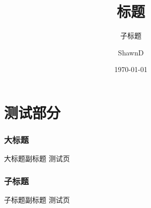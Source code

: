 \documentclass[10pt,mathserif]{beamer}%
\title{标题}
\subtitle{子标题}
\institute[西安电子科技大学\\人工智能学院]{西安电子科技大学人工智能学院} %
\author{ShawnD}
\date{\today}%
\begin{document}
%
{\xdbg {}}%

\part{测试部分}

\section{大标题}
\begin{frame}{大标题}{副标题}
	测试页
\end{frame}

\section{子标题}
\begin{frame}{子标题}{副标题}
	测试页
\end{frame}

{\xdbg%
\begin{frame}
\end{frame}}
\end{document}
